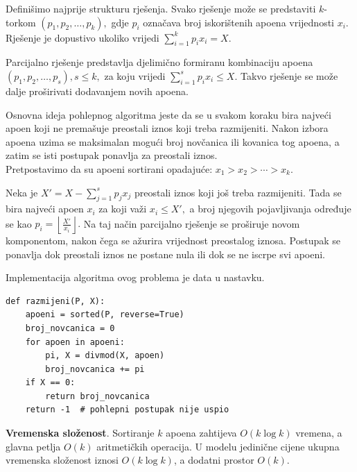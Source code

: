 \begin{solution}
	
	Definišimo najprije strukturu rješenja. Svako rješenje može se predstaviti $k$-torkom $(p_1,p_2,\ldots,p_k),$ gdje $p_i$ označava broj iskorištenih apoena vrijednosti $x_i$. Rješenje je dopustivo ukoliko vrijedi $\sum_{i=1}^{k} p_i x_i = X.$
	
	Parcijalno rješenje predstavlja djelimično formiranu kombinaciju apoena $(p_1,p_2,\ldots,p_s), s \leq k,$ za koju vrijedi $\sum_{i=1}^{s} p_i x_i \leq X.$ 	Takvo rješenje se može dalje proširivati dodavanjem novih apoena.
	
	Osnovna ideja pohlepnog algoritma jeste da se u svakom koraku bira najveći apoen koji ne premašuje preostali iznos koji treba razmijeniti. Nakon izbora apoena uzima se maksimalan mogući broj novčanica ili kovanica tog apoena, a zatim se isti postupak ponavlja za preostali iznos.\\ 
	
	Pretpostavimo da su apoeni sortirani opadajuće: $ x_1 > x_2 > \cdots > x_k.$
	
	Neka je $X' = X - \sum_{j=1}^{s} p_j x_j$ preostali iznos koji još treba razmijeniti. Tada se bira najveći apoen $x_i$ za koji važi $x_i \leq X',$ a broj njegovih pojavljivanja određuje se kao $p_i=\left\lfloor \frac{X'}{x_i}\right\rfloor.$  	Na taj način parcijalno rješenje se proširuje novom komponentom, nakon čega se ažurira vrijednost preostalog iznosa. Postupak se ponavlja dok preostali iznos ne postane nula ili dok se ne iscrpe svi apoeni.
	
\end{solution}

Implementacija algoritma ovog problema  je data u nastavku.
	 \begin{verbatim}
def razmijeni(P, X):
    apoeni = sorted(P, reverse=True)
    broj_novcanica = 0
    for apoen in apoeni:
        pi, X = divmod(X, apoen)
        broj_novcanica += pi
    if X == 0:
        return broj_novcanica
    return -1  # pohlepni postupak nije uspio
\end{verbatim} 


\textbf{Vremenska složenost}. Sortiranje $k$ apoena zahtijeva $O(k\log k)$ vremena, a glavna petlja $O(k)$ aritmetičkih operacija. U modelu jedinične cijene ukupna vremenska složenost iznosi $O(k\log k)$, a dodatni prostor $O(k)$.

